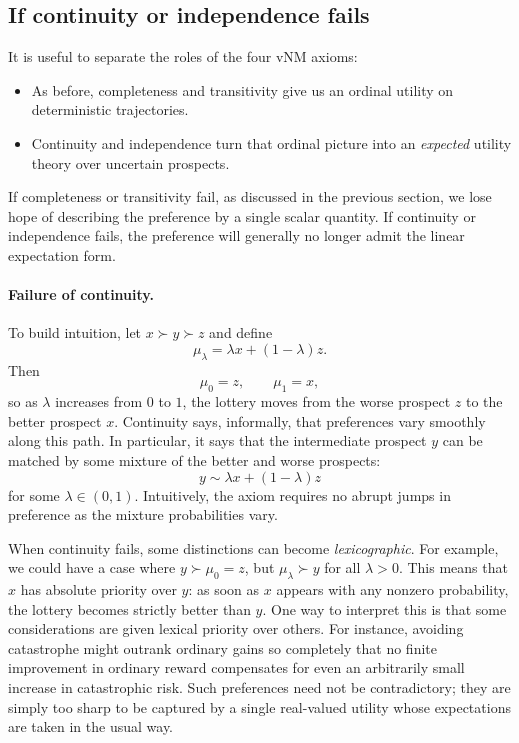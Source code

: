 \documentclass[11pt]{article}
\newcommand{\indiff}{\sim}
\begin{document}
\subsection*{If continuity or independence fails}

It is useful to separate the roles of the four vNM axioms:
\begin{itemize}
		\item As before, completeness and transitivity give us an ordinal utility on deterministic trajectories. 
		\item Continuity and independence turn that ordinal picture into an \emph{expected} utility theory over uncertain prospects. 
\end{itemize}
If completeness or transitivity fail, as discussed in the previous section, we
lose hope of describing the preference by a single scalar quantity.
If continuity or independence fails, the preference will generally no longer
admit the linear expectation form.


\paragraph{Failure of continuity.}
To build intuition, let $x\succ y\succ z$ and define
\[
\mu_\lambda=\lambda x + (1-\lambda)z.
\]
Then
\[
\mu_0=z,\qquad \mu_1=x,
\]
so as $\lambda$ increases from $0$ to $1$, the lottery moves from the worse
prospect $z$ to the better prospect $x$. Continuity says, informally, that
preferences vary smoothly along this path. In particular, it says that the
intermediate prospect $y$ can be matched by some mixture of the better and worse
prospects:
\[
y \indiff \lambda x + (1-\lambda)z
\]
for some $\lambda\in(0,1)$. Intuitively, the axiom requires no abrupt jumps
in preference as the mixture probabilities vary.


When continuity fails, some distinctions can become \emph{lexicographic}.
For example, we could have a case where $y\succ \mu_0 = z$, but
$\mu_\lambda\succ y$ for all $\lambda>0$.
This means that $x$ has absolute priority over $y$: as soon as $x$ appears with
any nonzero probability, the lottery becomes strictly better than $y$.
One way to interpret this is that some considerations are given lexical
priority over others. For instance, avoiding catastrophe might outrank ordinary
gains so completely that no finite improvement in ordinary reward compensates
for even an arbitrarily small increase in catastrophic risk.
Such preferences need not be contradictory; they are simply too sharp to be
captured by a single real-valued utility whose expectations are taken in the
usual way.
\end{document}
